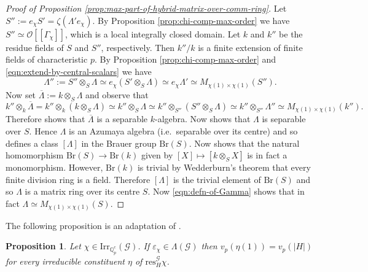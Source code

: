\documentclass[12pt]{amsart}
\theoremstyle{plain}
\newtheorem{prop}[theorem]{Proposition}
\theoremstyle{remark}
\theoremstyle{definition}
\numberwithin{equation}{section}
\begin{document}
\begin{proof}[Proof of Proposition \ref{prop:max-part-of-hybrid-matrix-over-comm-ring}]
Let $S'' :=e_{\chi}S'=\zeta(\Lambda' e_{\chi})$.
By Proposition \ref{prop:chi-comp-max-order} we have $S'' \simeq \mathcal{O}[[\Gamma_{\chi}]]$,
which is a local integrally closed domain.
Let $k$ and $k''$ be the residue fields of $S$ and $S''$, respectively.
Then $k''/k$ is a finite extension of finite fields of characteristic $p$.
By Proposition \ref{prop:chi-comp-max-order} and \eqref{eqn:extend-by-central-scalars} we have
\begin{equation}\label{eqn:defn-of-Gamma}
\Lambda'' := S'' \otimes_{S} \Lambda  \simeq e_{\chi}(S' \otimes_{S} \Lambda)
\simeq e_{\chi}\Lambda' \simeq M_{\chi(1) \times \chi(1)}(S'').
\end{equation}
Now set $\overline{\Lambda} := k \otimes_{S} \Lambda$ and observe that
\[
k'' \otimes_{k} \overline{\Lambda} = k'' \otimes_{k} (k \otimes_{S} \Lambda) \simeq k'' \otimes_{S} \Lambda
\simeq k'' \otimes_{S''} (S'' \otimes_{S} \Lambda) \simeq k'' \otimes_{S''} \Lambda'' \simeq M_{\chi(1) \times \chi(1)}(k'').
\]
Therefore \cite[Theorem 7.18]{MR1972204} shows that $\overline{\Lambda}$ is a separable $k$-algebra.
Now \cite[Theorem 4.7]{MR0121392} shows that $\Lambda$ is separable over $S$.
Hence $\Lambda$ is an Azumaya algebra (i.e.\ separable over its centre) and so defines a class $[\Lambda]$
in the Brauer group ${\mathrm{Br}}(S)$.
Now \cite[Corollary 6.2]{MR0121392} shows that the natural homomorphism
${\mathrm{Br}}(S) \rightarrow {\mathrm{Br}}(k)$ given by $[X] \mapsto [k \otimes_{S} X]$ is in fact a monomorphism.
However, ${\mathrm{Br}}(k)$ is trivial by Wedderburn's theorem that every finite division ring is a field.
Therefore $[\Lambda]$ is the trivial element of ${\mathrm{Br}}(S)$ and so $\Lambda$ is a matrix ring over its centre $S$.
Now \eqref{eqn:defn-of-Gamma} shows that in fact $\Lambda \simeq M_{\chi(1) \times \chi(1)}(S)$.
\end{proof}

The following proposition is an adaptation of \cite[Lemma 2.1]{hybrid-ETNC}.

\begin{prop}\label{prop:idempotent-implies-defect-zero}
Let $\chi \in {\mathrm{Irr}}_{{\mathbb{Q}}_{p}^{c}}(\mathcal{G})$.
If $\varepsilon_{\chi} \in \Lambda(\mathcal{G})$ then $v_{p}(\eta(1))=v_{p}(|H|)$ for every
irreducible constituent $\eta$ of ${\mathrm{res}}^{\mathcal{G}}_{H} \chi$.
\end{prop}
\end{document}
